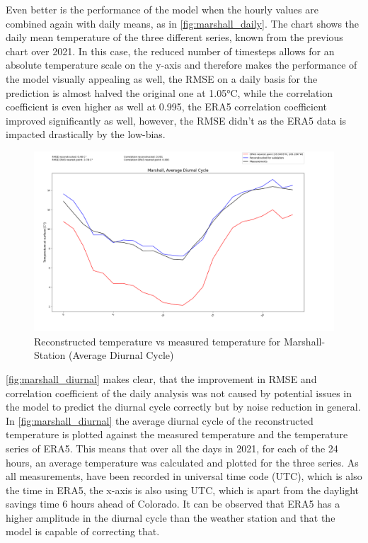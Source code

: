 Even better is the performance of the model when the hourly values are combined again with daily means, as in \autoref{fig:marshall_daily}. The chart shows the daily mean temperature of the three different series, known from the previous chart over 2021. In this case, the reduced number of timesteps allows for an absolute temperature scale on the y-axis and therefore makes the performance of the model visually appealing as well, the RMSE on a daily basis for the prediction is almost halved the original one at 1.05°C, while the correlation coefficient is even higher as well at 0.995, the ERA5 correlation coefficient improved significantly as well, however, the RMSE didn't as the ERA5 data is impacted drastically by the low-bias.

\begin{figure}
    \centering
    \includegraphics[width=1.07\textwidth]{resources/images/charts/marshall_eval_grib_final/Marshall, Average Diurnal Cycle.png}
    \caption{Reconstructed temperature vs measured temperature for Marshall-Station (Average Diurnal Cycle)}
    \label{fig:marshall_diurnal}
\end{figure}

\autoref{fig:marshall_diurnal} makes clear, that the improvement in RMSE and correlation coefficient of the daily analysis was not caused by potential issues in the model to predict the diurnal cycle correctly but by noise reduction in general. In \autoref{fig:marshall_diurnal} the average diurnal cycle of the reconstructed temperature is plotted against the measured temperature and the temperature series of ERA5. This means that over all the days in 2021, for each of the 24 hours, an average temperature was calculated and plotted for the three series. As all measurements, have been recorded in universal time code (UTC), which is also the time in ERA5, the x-axis is also using UTC, which is apart from the daylight savings time 6 hours ahead of Colorado. It can be observed that ERA5 has a higher amplitude in the diurnal cycle than the weather station and that the model is capable of correcting that.


